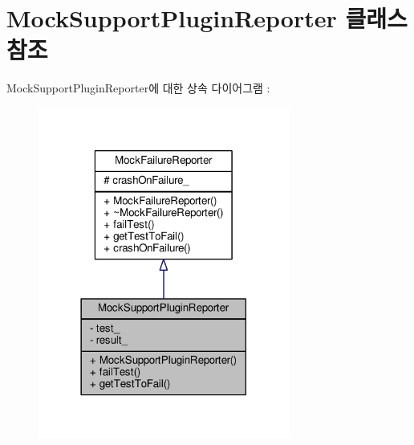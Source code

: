 \hypertarget{class_mock_support_plugin_reporter}{}\section{Mock\+Support\+Plugin\+Reporter 클래스 참조}
\label{class_mock_support_plugin_reporter}


Mock\+Support\+Plugin\+Reporter에 대한 상속 다이어그램 \+: 
\nopagebreak
\begin{figure}[H]
\begin{center}
\leavevmode
\includegraphics[width=234pt]{class_mock_support_plugin_reporter__inherit__graph}
\end{center}
\end{figure}


